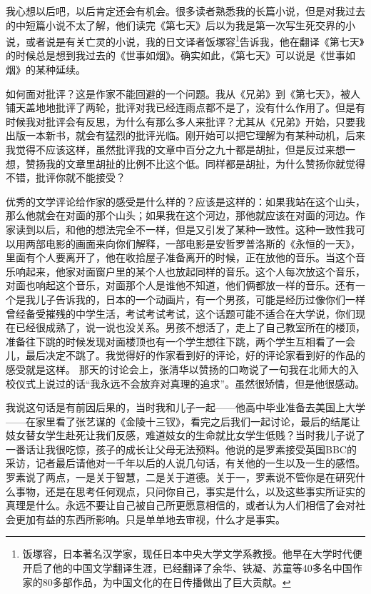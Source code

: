 \documentclass[12pt,a5paper]{ctexbook}
\begin{document}
我心想以后吧，以后肯定还会有机会。很多读者熟悉我的长篇小说，但是对我过去的中短篇小说不太了解，他们读完《第七天》后以为我是第一次写生死交界的小说，或者说是有关亡灵的小说，我的日文译者饭塚容\footnote{饭塚容，日本著名汉学家，现任日本中央大学文学系教授。他早在大学时代便开启了他的中国文学翻译生涯，已经翻译了余华、铁凝、苏童等40多名中国作家的80多部作品，为中国文化的在日传播做出了巨大贡献。}告诉我，他在翻译《第七天》的时候总是想到我过去的《世事如烟》。确实如此，《第七天》可以说是《世事如烟》的某种延续。

如何面对批评？这是作家不能回避的一个问题。我从《兄弟》到《第七天》，被人铺天盖地地批评了两轮，批评对我已经连雨点都不是了，没有什么作用了。但是有时候我对批评会有反思，为什么有那么多人来批评？尤其从《兄弟》开始，只要我出版一本新书，就会有猛烈的批评光临。刚开始可以把它理解为有某种动机，后来我觉得不应该这样，虽然批评我的文章中百分之九十都是胡扯，但是反过来想一想，赞扬我的文章里胡扯的比例不比这个低。同样都是胡扯，为什么赞扬你就觉得不错，批评你就不能接受？

优秀的文学评论给作家的感受是什么样的？应该是这样的：如果我站在这个山头，那么他就会在对面的那个山头；如果我在这个河边，那他就应该在对面的河边。作家读到以后，和他的想法完全不一样，但是又引发了某种一致性。这种一致性我可以用两部电影的画面来向你们解释，一部电影是安哲罗普洛斯的《永恒的一天》，里面有个人要离开了，他在收拾屋子准备离开的时候，正在放他的音乐。当这个音乐响起来，他家对面窗户里的某个人也放起同样的音乐。这个人每次放这个音乐，对面也响起这个音乐，对面那个人是谁他不知道，他们俩都放一样的音乐。还有一个是我儿子告诉我的，日本的一个动画片，有一个男孩，可能是经历过像你们一样曾经备受摧残的中学生活，考试考试考试，这个话题可能不适合在大学说，你们现在已经很成熟了，说一说也没关系。男孩不想活了，走上了自己教室所在的楼顶，准备往下跳的时候发现对面楼顶也有一个学生想往下跳，两个学生互相看了一会儿，最后决定不跳了。我觉得好的作家看到好的评论，好的评论家看到好的作品的感受就是这样。
那天的讨论会上，张清华以赞扬的口吻说了一句我在北师大的入校仪式上说过的话“我永远不会放弃对真理的追求”。虽然很矫情，但是他很感动。

我说这句话是有前因后果的，当时我和儿子一起——他高中毕业准备去美国上大学——在家里看了张艺谋的《金陵十三钗》，看完之后我们一起讨论，最后的结尾让妓女替女学生赴死让我们反感，难道妓女的生命就比女学生低贱？当时我儿子说了一番话让我很吃惊，孩子的成长让父母无法预料。他说的是罗素接受英国BBC的采访，记者最后请他对一千年以后的人说几句话，有关他的一生以及一生的感悟。罗素说了两点，一是关于智慧，二是关于道德。关于一，罗素说不管你是在研究什么事物，还是在思考任何观点，只问你自己，事实是什么，以及这些事实所证实的真理是什么。永远不要让自己被自己所更愿意相信的，或者认为人们相信了会对社会更加有益的东西所影响。只是单单地去审视，什么才是事实。
\end{document}
